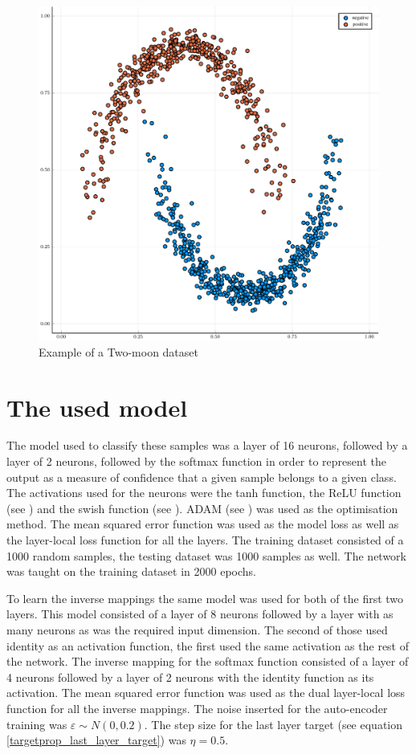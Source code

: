\begin{figure}
	\centering
	\includegraphics[width=\textwidth]{images/two-moon/two-moon.pdf}
	\caption{Example of a Two-moon dataset}\label{twomoon}
\end{figure}

\section{The used model}

The model used to classify these samples was a layer of 16 neurons, followed by a layer of 2 neurons, followed by the softmax function in order to represent the output as a measure of confidence that a given sample belongs to a given class. The activations used for the neurons were the tanh function, the ReLU function (see \cite{hahnloser_digital_2000}) and the swish function (see \cite{ramachandran_searching_2018}). ADAM (see \cite{kingma_adam:_2014}) was used as the optimisation method. The mean squared error function was used as the model loss as well as the layer-local loss function for all the layers. The training dataset consisted of a 1000 random samples, the testing dataset was 1000 samples as well. The network was taught on the training dataset in 2000 epochs.

To learn the inverse mappings the same model was used for both of the first two layers. This model consisted of a layer of 8 neurons followed by a layer with as many neurons as was the required input dimension. The second of those used identity as an activation function, the first used the same activation as the rest of the network. The inverse mapping for the softmax function consisted of a layer of 4 neurons followed by a layer of 2 neurons with the identity function as its activation. The mean squared error function was used as the dual layer-local loss function for all the inverse mappings. The noise inserted for the auto-encoder training was \( \varepsilon \sim N \left( 0, 0.2 \right) \). The step size for the last layer target (see equation \ref{targetprop_last_layer_target}) was \( \eta = 0.5 \).


